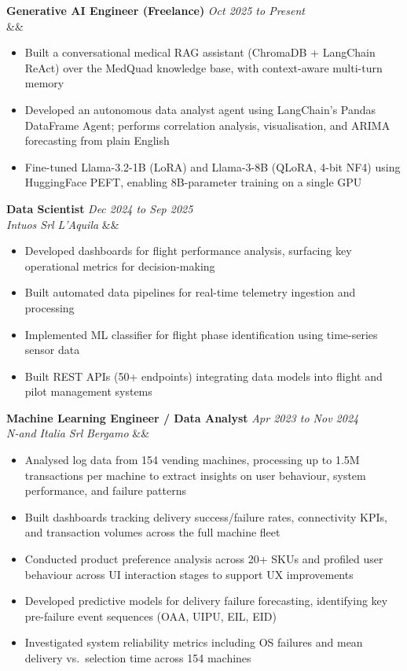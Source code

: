 \documentclass[10pt,a4paper]{article}
\newcommand{\cventry}[5]{%
  \noindent\textbf{#1} \hfill \textit{#2}\\
  \textit{#3} \hfill \textit{#4}%
  \ifx&#5&\else\\\textit{#5}\fi
  \vspace{2pt}
}
\begin{document}
\cventry{Generative AI Engineer (Freelance)}{Oct 2025 to Present}{}{}{}
\begin{itemize}
  \item Built a conversational medical RAG assistant (ChromaDB + LangChain ReAct) over the MedQuad knowledge base, with context-aware multi-turn memory
  \item Developed an autonomous data analyst agent using LangChain's Pandas DataFrame Agent; performs correlation analysis, visualisation, and ARIMA forecasting from plain English
  \item Fine-tuned Llama-3.2-1B (LoRA) and Llama-3-8B (QLoRA, 4-bit NF4) using HuggingFace PEFT, enabling 8B-parameter training on a single GPU
\end{itemize}

\medskip
\cventry{Data Scientist}{Dec 2024 to Sep 2025}{Intuos Srl}{L'Aquila}{}
\begin{itemize}
  \item Developed dashboards for flight performance analysis, surfacing key operational metrics for decision-making
  \item Built automated data pipelines for real-time telemetry ingestion and processing
  \item Implemented ML classifier for flight phase identification using time-series sensor data
  \item Built REST APIs (50+ endpoints) integrating data models into flight and pilot management systems
\end{itemize}

\medskip
\cventry{Machine Learning Engineer / Data Analyst}{Apr 2023 to Nov 2024}{N-and Italia Srl}{Bergamo}{}
\begin{itemize}
  \item Analysed log data from 154 vending machines, processing up to 1.5M transactions per machine to extract insights on user behaviour, system performance, and failure patterns
  \item Built dashboards tracking delivery success/failure rates, connectivity KPIs, and transaction volumes across the full machine fleet
  \item Conducted product preference analysis across 20+ SKUs and profiled user behaviour across UI interaction stages to support UX improvements
  \item Developed predictive models for delivery failure forecasting, identifying key pre-failure event sequences (OAA, UIPU, EIL, EID)
  \item Investigated system reliability metrics including OS failures and mean delivery vs.\ selection time across 154 machines
\end{itemize}
\end{document}
